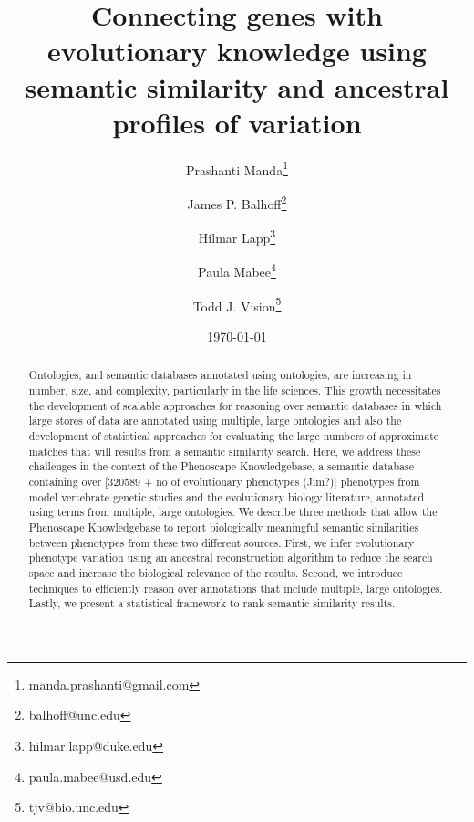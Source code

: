 \documentclass{article}
\begin{document}
\title{Connecting genes with evolutionary knowledge  using semantic similarity and ancestral profiles of variation}
\author[1]{Prashanti Manda\thanks{manda.prashanti@gmail.com}}
\author[1]{James P. Balhoff\thanks{balhoff@unc.edu}}
\author[2]{Hilmar Lapp\thanks{hilmar.lapp@duke.edu}}
\author[3]{Paula Mabee\thanks{paula.mabee@usd.edu}}
\author[1]{Todd J. Vision\thanks{tjv@bio.unc.edu}}


\renewcommand\Authands{ and }


\date{\today}
\maketitle
\begin{abstract}
Ontologies, and semantic databases annotated using ontologies, are increasing in number, size, and complexity, particularly in the life sciences. This growth necessitates the development of scalable approaches for reasoning over semantic databases in which large stores of data are annotated using multiple, large ontologies and also the development of statistical approaches for evaluating the large numbers of approximate matches that will results from a semantic similarity search. Here, we address these challenges in the context of the Phenoscape Knowledgebase, a semantic database containing over [320589 + no of evolutionary phenotypes (Jim?)] phenotypes from model vertebrate genetic studies and the evolutionary biology literature, annotated using terms from multiple, large ontologies. We describe three methods that allow the Phenoscape Knowledgebase to report biologically meaningful semantic similarities between phenotypes from these two different sources. First, we infer evolutionary phenotype variation using an ancestral reconstruction algorithm to reduce the search space and increase the biological relevance of the results. Second, we introduce techniques to efficiently reason over annotations that include multiple, large ontologies. Lastly, we present a statistical framework to rank semantic similarity results.

\end{abstract}


\end{document}
